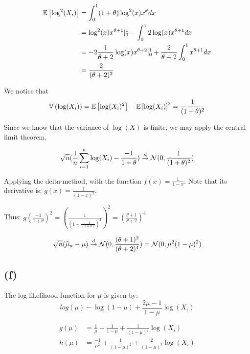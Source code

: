 \documentclass[12pt]{paper}
\begin{document}
\begin{align*}
  \mathbb{E} \left [ \log^2(X_i) \right ] &= \int_0^1 (1+\theta)\log^2(x ) x^{\theta}dx\\
                    &= \log^2(x) x^{\theta+1} \vert_0^1 - \int_0^1 2 \log(x) x^{\theta+1}dx\\
  &= - 2 \frac{1}{\theta+2} \log(x) x^{\theta+2} \vert_0^1 + \frac{2}{\theta+2} \int_0^1
    x^{\theta+1}dx\\
  &= \frac{2}{(\theta+2)^2}
\end{align*}

We notice that
\begin{equation*}
\mathbb{V} \left ( \log(X_i) \right ) = \mathbb{E} \left [  \log(X_i)^2 \right ] - \mathbb{E} \left [ \log(X_i) \right ]^2 = \frac{1}{(1+\theta)^2}
\end{equation*}

Since we know that the variance of $\log(X)$ is finite, we may apply
the central limit theorem.

\begin{equation*}
 \sqrt{n} ( \frac{1}{n} \sum_{i=1}^n \log( X_i) - \frac{-1}{1+\theta} )
 \overset{d}{\to} \mathcal{N}( 0, \frac{1}{(1+\theta)^2})
\end{equation*}

Applying the delta-method, with the function $f(x) = \frac{1}{1-x}$.
Note that its derivative is: $g(x) = \frac{1}{(1-x)^2}$.

Thus: $g( \frac{-1}{1+\theta})^2 = \left( \frac{1}{(1-\frac{-1}{(1+\theta)})^2}
\right)^2 = \left(  \frac{\theta+1}{\theta+2} \right)^4$

\begin{equation*}
  \sqrt{n} ( \widehat{ \mu }_{n} - \mu) \overset{d}{\to} \mathcal{N}( 0,
  \frac{(\theta+1)^2}{(\theta+2)^4} ) = \mathcal{N}( 0, \mu^2 ( 1 - \mu)^2)
\end{equation*}

\subsection{(f)}

The log-likelihood function for $\mu$ is given by:
\begin{equation*}
  log(\mu) - \log( 1 - \mu) + \frac{2\mu - 1}{ 1 - \mu} \log( X_i )
\end{equation*}

\begin{align*}
  g(\mu) &= \frac{1}{\mu} + \frac{1}{1-\mu} + \frac{1}{(1-\mu)^2} \log( X_i)\\
  h(\mu) &= \frac{-1}{\mu^2} + \frac{1}{(1-\mu)^2} + \frac{2}{(1-\mu)^3} \log(X_i)
\end{align*}
\end{document}
